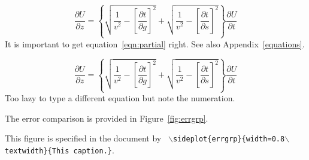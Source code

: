 \documentclass[paper,revised]{geophysics}
\begin{document}
\begin{equation}
\frac{\partial U}{\partial z} = 
\left\{
  \sqrt{\frac{1}{v^2} - \left[\frac{\partial t}{\partial g}\right]^2} +
  \sqrt{\frac{1}{v^2} - \left[\frac{\partial t}{\partial s}\right]^2}
\right\}
\frac{\partial U}{\partial t}
\label{eqn:partial}
\end{equation}
It is important to get equation~\ref{eqn:partial} right. See also
Appendix~\ref{equations}.


\begin{equation}
\frac{\partial U}{\partial z} = 
\left\{
  \sqrt{\frac{1}{v^2} - \left[\frac{\partial t}{\partial g}\right]^2} +
  \sqrt{\frac{1}{v^2} - \left[\frac{\partial t}{\partial s}\right]^2}
\right\}
\frac{\partial U}{\partial t}
\label{eqn:partial2}
\end{equation}
Too lazy to type a different equation but note the numeration.

The error comparison is provided in Figure~\ref{fig:errgrp}.

{This figure is specified in the document by \texttt{
    $\backslash$sideplot\{errgrp\}\{width=0.8$\backslash$text\-width\}\{This caption.\}}.
}







\newpage


\end{document}
